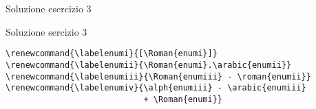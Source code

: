 \begin{frame}[fragile]{Soluzione esercizio 3}

\begin{soluzione}{Soluzione sercizio 3}
\begin{code}
\begin{verbatim}
\renewcommand{\labelenumi}{[\Roman{enumi}]}
\renewcommand{\labelenumii}{\Roman{enumi}.\arabic{enumii}}
\renewcommand{\labelenumiii}{\Roman{enumiii} - \roman{enumii}}
\renewcommand{\labelenumiv}{\alph{enumiii} - \arabic{enumiii} 
                            + \Roman{enumi}}
\end{verbatim}
\end{code}
\end{soluzione}

\end{frame}